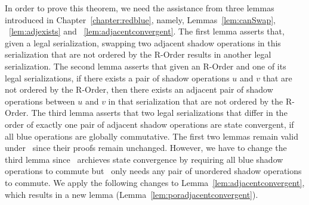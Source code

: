 In order to prove this theorem, we need the assistance from three lemmas introduced in Chapter~\ref{chapter:redblue}, namely,
Lemmas~\ref{lem:canSwap}, ~\ref{lem:adjexists} and ~\ref{lem:adjacentconvergent}. The first lemma asserts that,                             
given a legal serialization, swapping two adjacent
shadow operations in this serialization that are not ordered by the R-Order
results in another legal serialization. The second lemma asserts that given an R-Order and one of its legal serializations, if there exists
a pair of shadow operations $u$ and $v$ that are not ordered by the R-Order, then there exists an adjacent
pair of shadow operations between $u$ and $v$ in that serialization that are not ordered
by the R-Order. The third lemma asserts that two legal serializations that differ
in the order of exactly one pair of adjacent shadow operations are state
convergent, if all blue operations are globally commutative. The first two lemmas remain valid under \PRCN\ since their proofs
remain unchanged. However, we have to change the third lemma since \RBCN\ archieves state convergence by requiring
all blue shadow operations to commute but \PRCN\ only needs any pair of unordered shadow operations
to commute. We apply the following changes to Lemma~\ref{lem:adjacentconvergent},
which results in a new lemma (Lemma~\ref{lem:poradjacentconvergent}).
\fi

